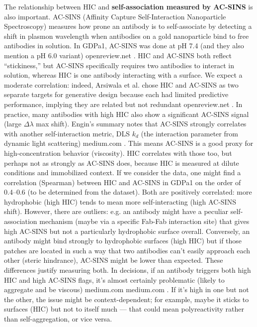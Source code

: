 \documentclass[12pt]{article}
\begin{document}
The relationship between HIC and \textbf{self-association measured by AC-SINS} is also important. AC-SINS (Affinity Capture Self-Interaction Nanoparticle Spectroscopy) measures how prone an antibody is to self-associate by detecting a shift in plasmon wavelength when antibodies on a gold nanoparticle bind to free antibodies in solution. In GDPa1, AC-SINS was done at pH 7.4 (and they also mention a pH 6.0 variant)
openreview.net
. HIC and AC-SINS both reflect “stickiness,” but AC-SINS specifically requires two antibodies to interact in solution, whereas HIC is one antibody interacting with a surface. We expect a moderate correlation: indeed, Arsiwala et al. chose HIC and AC-SINS as two separate targets for generative design because each had limited predictive performance, implying they are related but not redundant
openreview.net
. In practice, many antibodies with high HIC also show a significant AC-SINS signal (large $\Delta \lambda$ max shift). Engin’s summary notes that AC-SINS strongly correlates with another self-interaction metric, DLS $k_d$ (the interaction parameter from dynamic light scattering)
medium.com
. This means AC-SINS is a good proxy for high-concentration behavior (viscosity). HIC correlates with those too, but perhaps not as strongly as AC-SINS does, because HIC is measured at dilute conditions and immobilized context. If we consider the data, one might find a correlation (Spearman) between HIC and AC-SINS in GDPa1 on the order of 0.4–0.6 (to be determined from the dataset). Both are positively correlated: more hydrophobic (high HIC) tends to mean more self-interacting (high AC-SINS shift). However, there are outliers: e.g. an antibody might have a peculiar self-association mechanism (maybe via a specific Fab-Fab interaction site) that gives high AC-SINS but not a particularly hydrophobic surface overall. Conversely, an antibody might bind strongly to hydrophobic surfaces (high HIC) but if those patches are located in such a way that two antibodies can’t easily approach each other (steric hindrance), AC-SINS might be lower than expected. These differences justify measuring both. In decisions, if an antibody triggers both high HIC and high AC-SINS flags, it’s almost certainly problematic (likely to aggregate and be viscous)
medium.com
medium.com
. If it’s high in one but not the other, the issue might be context-dependent; for example, maybe it sticks to surfaces (HIC) but not to itself much — that could mean polyreactivity rather than self-aggregation, or vice versa.
\end{document}
